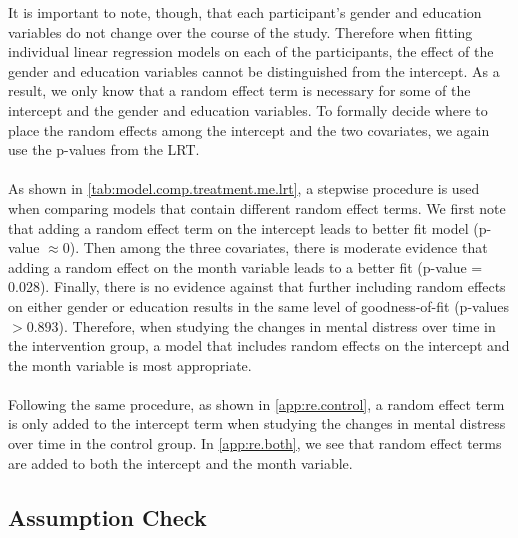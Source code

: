 It is important to note, though, that each participant's gender and education variables do not change over the course of the study. Therefore when fitting individual linear regression models on each of the participants, the effect of the gender and education variables cannot be distinguished from the intercept. As a result, we only know that a random effect term is necessary for some of the intercept and the gender and education variables. To formally decide where to place the random effects among the intercept and the two covariates, we again use the p-values from the LRT.\\\\
As shown in \cref{tab:model.comp.treatment.me.lrt}, a stepwise procedure is used when comparing models that contain different random effect terms. We first note that adding a random effect term on the intercept leads to better fit model (p-value $\approx 0$). Then among the three covariates, there is moderate evidence that adding a random effect on the month variable leads to a better fit (p-value = 0.028). Finally, there is no evidence against that further including random effects on either gender or education results in the same level of goodness-of-fit (p-values $>0.893$). Therefore, when studying the changes in mental distress over time in the intervention group, a model that includes random effects on the intercept and the month variable is most appropriate.\\\\
Following the same procedure, as shown in \cref{app:re.control}, a random effect term is only added to the intercept term when studying the changes in mental distress over time in the control group. In \cref{app:re.both}, we see that random effect terms are added to both the intercept and the month variable.
\subsection{Assumption Check}

